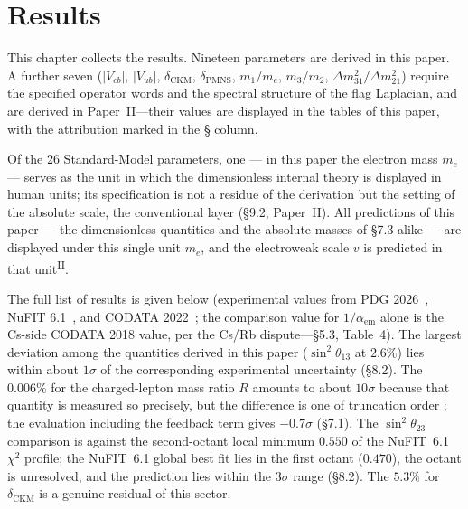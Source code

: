 \documentclass[12pt,a4paper]{article}
\newcommand{\PII}{\textsuperscript{\textup{II}}}
\begin{document}
\section{Results}\label{sec:results}

This chapter collects the results. Nineteen parameters are derived in
this paper. A further seven ($|V_{cb}|$, $|V_{ub}|$, $\delta_\mathrm{CKM}$,
$\delta_\mathrm{PMNS}$, $m_1/m_e$, $m_3/m_2$, $\Delta m^2_{31}/\Delta m^2_{21}$)
require the specified operator words and the spectral structure of the flag Laplacian, and are derived in Paper~II---their values are displayed in the tables of this paper, with the attribution marked in the \S{} column.

Of the 26 Standard-Model parameters, one — in this paper the electron mass $m_e$ — serves as the unit in which the dimensionless internal theory is displayed in human units; its specification is not a residue of the derivation but the setting of the absolute scale, the conventional layer (\S9.2, Paper~II). All predictions of this paper --- the dimensionless quantities and the absolute masses of \S7.3 alike --- are displayed under this single unit $m_e$, and the electroweak scale $v$ is predicted in that unit\PII{}.

The full list of results is given below (experimental values from PDG 2026~\cite{pdg}, NuFIT 6.1~\cite{nufit}, and CODATA 2022~\cite{codata}; the comparison value for $1/\alpha_\mathrm{em}$ alone is the Cs-side CODATA 2018 value, per the Cs/Rb dispute---\S5.3, Table~4). The largest deviation among the quantities derived in this paper ($\sin^2\!\theta_{13}$ at $2.6\%$) lies within about $1\sigma$ of the corresponding experimental uncertainty (\S8.2). The $0.006\%$ for the charged-lepton mass ratio $R$ amounts to about $10\sigma$ because that quantity is measured so precisely, but the difference is one of truncation order ; the evaluation including the feedback term gives $-0.7\sigma$ (\S7.1). The $\sin^2\!\theta_{23}$ comparison is against the second-octant local minimum $0.550$ of the NuFIT~6.1 $\chi^2$ profile; the NuFIT~6.1 global best fit lies in the first octant ($0.470$), the octant is unresolved, and the prediction lies within the $3\sigma$ range (\S8.2). The $5.3\%$ for $\delta_\mathrm{CKM}$ is a genuine residual of this sector.
\end{document}
